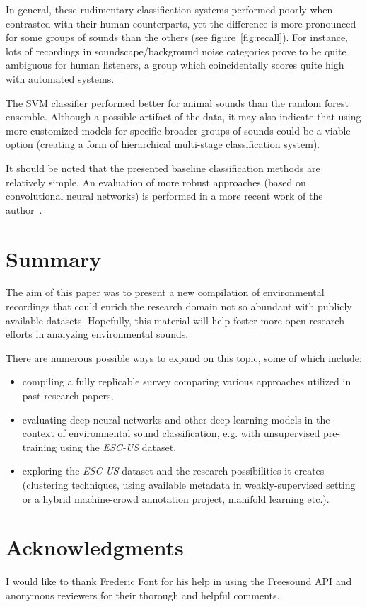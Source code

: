 \documentclass[letterpaper]{sig-alternate}
\begin{document}
In general, these rudimentary classification systems performed poorly when contrasted with their human counterparts, yet the difference is more pronounced for some groups of sounds than the others (see figure~\ref{fig:recall}). For instance, lots of recordings in soundscape/background noise categories prove to be quite ambiguous for human listeners, a group which coincidentally scores quite high with automated systems.

The SVM classifier performed better for animal sounds than the random forest ensemble. Although a possible artifact of the data, it may also indicate that using more customized models for specific broader groups of sounds could be a viable option (creating a form of hierarchical multi-stage classification system).

It should be noted that the presented baseline classification methods are relatively simple. An evaluation of more robust approaches (based on convolutional neural networks) is performed in a more recent work of the author~\cite{piczak2015esc-convnet}.

\vspace{-2pt}

\section{Summary}

The aim of this paper was to present a new compilation of environmental recordings that could enrich the research domain not so abundant with publicly available datasets. Hopefully, this material will help foster more open research efforts in analyzing environmental sounds.

There are numerous possible ways to expand on this topic, some of which include:

\begin{itemize}[noitemsep,topsep=0pt]
\item compiling a fully replicable survey comparing various approaches utilized in past research papers,
\item evaluating deep neural networks and other deep learning models in the context of environmental sound classification, e.g. with unsupervised pre-training using the \textit{ESC-US} dataset,
\item exploring the \textit{ESC-US} dataset and the research possibilities it creates (clustering techniques, using available metadata in weakly-supervised setting or a hybrid machine-crowd annotation project, manifold learning etc.).
\end{itemize}

\vspace{-8pt}

\section*{Acknowledgments}

I would like to thank Frederic Font for his help in using the Freesound API and anonymous reviewers for their thorough and helpful comments.




\end{document}
